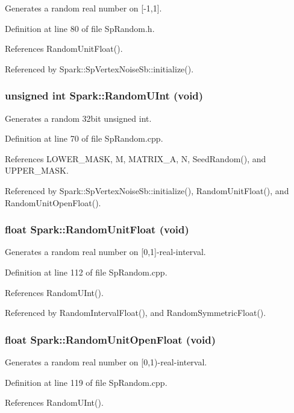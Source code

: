 Generates a random real number on [-1,1]. 

Definition at line 80 of file Sp\-Random.h.

References Random\-Unit\-Float().

Referenced by Spark::Sp\-Vertex\-Noise\-Sb::initialize().
\subsubsection{\setlength{\rightskip}{0pt plus 5cm}unsigned int Spark::Random\-UInt (void)}\label{namespaceSpark_a113}


Generates a random 32bit unsigned int. 

Definition at line 70 of file Sp\-Random.cpp.

References LOWER\_\-MASK, M, MATRIX\_\-A, N, Seed\-Random(), and UPPER\_\-MASK.

Referenced by Spark::Sp\-Vertex\-Noise\-Sb::initialize(), Random\-Unit\-Float(), and Random\-Unit\-Open\-Float().
\subsubsection{\setlength{\rightskip}{0pt plus 5cm}float Spark::Random\-Unit\-Float (void)}\label{namespaceSpark_a114}


Generates a random real number on [0,1]-real-interval. 

Definition at line 112 of file Sp\-Random.cpp.

References Random\-UInt().

Referenced by Random\-Interval\-Float(), and Random\-Symmetric\-Float().
\subsubsection{\setlength{\rightskip}{0pt plus 5cm}float Spark::Random\-Unit\-Open\-Float (void)}\label{namespaceSpark_a115}


Generates a random real number on [0,1)-real-interval. 

Definition at line 119 of file Sp\-Random.cpp.

References Random\-UInt().
